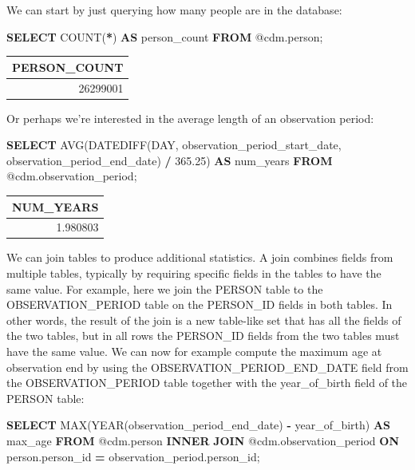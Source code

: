 \documentclass[11pt]{book}
\newenvironment{Shaded}{\begin{snugshade}}{\end{snugshade}}
\newcommand{\DataTypeTok}[1]{\textcolor[rgb]{0.13,0.29,0.53}{#1}}
\newcommand{\FloatTok}[1]{\textcolor[rgb]{0.00,0.00,0.81}{#1}}
\newcommand{\FunctionTok}[1]{\textcolor[rgb]{0.00,0.00,0.00}{#1}}
\newcommand{\KeywordTok}[1]{\textcolor[rgb]{0.13,0.29,0.53}{\textbf{#1}}}
\newcommand{\NormalTok}[1]{#1}
\newcommand{\OperatorTok}[1]{\textcolor[rgb]{0.81,0.36,0.00}{\textbf{#1}}}
\theoremstyle{definition}
\theoremstyle{definition}
\theoremstyle{definition}
\theoremstyle{remark}
\begin{document}
We can start by just querying how many people are in the database:

\begin{Shaded}
\begin{Highlighting}[]
\KeywordTok{SELECT} \FunctionTok{COUNT}\NormalTok{(}\OperatorTok{*}\NormalTok{) }\KeywordTok{AS}\NormalTok{ person_count }\KeywordTok{FROM}\NormalTok{ @cdm.person;}
\end{Highlighting}
\end{Shaded}

\begin{longtable}[]{@{}r@{}}
\toprule
PERSON\_COUNT\tabularnewline
\midrule
\endhead
26299001\tabularnewline
\bottomrule
\end{longtable}

Or perhaps we're interested in the average length of an observation period:

\begin{Shaded}
\begin{Highlighting}[]
\KeywordTok{SELECT} \FunctionTok{AVG}\NormalTok{(DATEDIFF(}\DataTypeTok{DAY}\NormalTok{, }
\NormalTok{                    observation_period_start_date, }
\NormalTok{                    observation_period_end_date) }\OperatorTok{/} \FloatTok{365.25}\NormalTok{) }\KeywordTok{AS}\NormalTok{ num_years}
\KeywordTok{FROM}\NormalTok{ @cdm.observation_period;}
\end{Highlighting}
\end{Shaded}

\begin{longtable}[]{@{}r@{}}
\toprule
NUM\_YEARS\tabularnewline
\midrule
\endhead
1.980803\tabularnewline
\bottomrule
\end{longtable}

We can join tables to produce additional statistics. A join combines fields from multiple tables, typically by requiring specific fields in the tables to have the same value. For example, here we join the PERSON table to the OBSERVATION\_PERIOD table on the PERSON\_ID fields in both tables. In other words, the result of the join is a new table-like set that has all the fields of the two tables, but in all rows the PERSON\_ID fields from the two tables must have the same value. We can now for example compute the maximum age at observation end by using the OBSERVATION\_PERIOD\_END\_DATE field from the OBSERVATION\_PERIOD table together with the year\_of\_birth field of the PERSON table:

\begin{Shaded}
\begin{Highlighting}[]
\KeywordTok{SELECT} \FunctionTok{MAX}\NormalTok{(}\DataTypeTok{YEAR}\NormalTok{(observation_period_end_date) }\OperatorTok{-}
\NormalTok{           year_of_birth) }\KeywordTok{AS}\NormalTok{ max_age}
\KeywordTok{FROM}\NormalTok{ @cdm.person}
\KeywordTok{INNER} \KeywordTok{JOIN}\NormalTok{ @cdm.observation_period}
  \KeywordTok{ON}\NormalTok{ person.person_id }\OperatorTok{=}\NormalTok{ observation_period.person_id;}
\end{Highlighting}
\end{Shaded}
\end{document}
